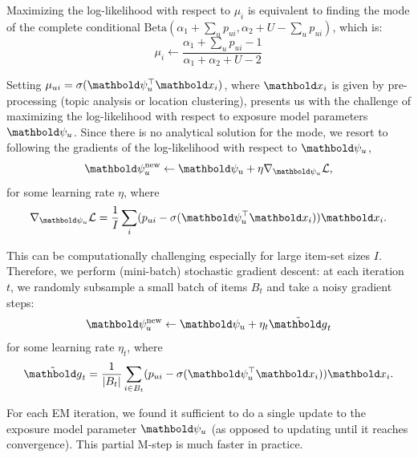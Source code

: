  Maximizing the log-likelihood with respect to $\mu_i$ is equivalent to finding the mode of the complete conditional $\mathrm{Beta}(\alpha_1 + \sum_u p_{ui}, \alpha_2 + U - \sum_u p_{ui})$, which is:
\begin{equation}\label{eq:mu_i}
\mu_i \leftarrow \frac{\alpha_1 + \sum_u p_{ui}- 1}{\alpha_1 + \alpha_2 + U - 2}
\end{equation}

 Setting $\mu_{ui} = \sigma(\mb\psi_u^\top \mbx_i)$, where $\mbx_i$ is given by pre-processing (topic analysis or location clustering), presents us with the challenge of maximizing the log-likelihood with respect to exposure model parameters $\mb\psi_u$. Since there is no analytical solution for the mode, we resort to following the gradients of the log-likelihood with respect to $\mb\psi_u$,
\begin{equation}
	\mb\psi_u^{\text{new}} \leftarrow \mb\psi_u + \eta \nabla_{\mb\psi_u} \mathcal{L}, %
	\label{eq:update_psi}
\end{equation}
for some learning rate $\eta$, where
\begin{equation*}
	\nabla_{\mb\psi_u} \mathcal{L} =  \frac{1}{I}\sum_i ( p_{ui} - \sigma(\mb\psi_u^\top \mbx_i))\mbx_i.
\end{equation*}

This can be computationally challenging especially for large item-set sizes $I$. Therefore, we perform (mini-batch) stochastic gradient descent: at each iteration $t$, we randomly subsample a small batch of items $B_t$ and take a noisy gradient steps:
\begin{equation} \label{eq:update_psi_sgd}
\mb\psi_u^{\text{new}} \leftarrow \mb\psi_u + \eta_t \tilde{\mb{g}}_t
\end{equation}
for some learning rate $\eta_t$, where
\begin{equation*}
\tilde{\mb{g}}_t =  \frac{1}{|B_t|}\sum_{i \in B_t} (p_{ui} - \sigma(\mb\psi_u^\top \mbx_i)) \mbx_i.
\end{equation*}

For each \gls{EM} iteration, we found it sufficient to do a single update to the
exposure model parameter $\mb\psi_u$ (as opposed to updating until it
reaches convergence). This partial M-step \citep{neal1998view} is much faster in practice. 

